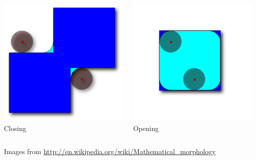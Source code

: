 \begin{frame}[fragile]
\begin{columns}[c]
\begin{center}
\includegraphics[width=1\textwidth]{Images/Closing_shadow} \\
Closing
\end{center}

\begin{center}
\includegraphics[width=1\textwidth]{Images/Opening_shadow} \\
Opening
\end{center}
\end{columns}
\vspace{12pt}
Images from \url{http://en.wikipedia.org/wiki/Mathematical_morphology}
\end{frame}

